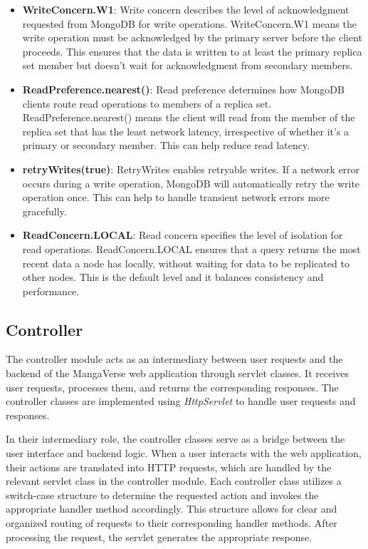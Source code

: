 \begin{itemize}
    \item \textbf{WriteConcern.W1}: Write concern describes the level of acknowledgment requested from MongoDB for write operations. 
    WriteConcern.W1 means the write operation must be acknowledged by the primary server before the client proceeds. 
    This ensures that the data is written to at least the primary replica set member but doesn't wait for 
    acknowledgment from secondary members.
    \item \textbf{ReadPreference.nearest()}: Read preference determines how MongoDB clients route read operations 
    to members of a replica set. ReadPreference.nearest() means the client will read from the member of the replica 
    set that has the least network latency, irrespective of whether it's a primary or secondary member. This can help 
    reduce read latency.
    \item \textbf{retryWrites(true)}: RetryWrites enables retryable writes. If a network error occurs during a write 
    operation, MongoDB will automatically retry the write operation once. This can help to handle transient network 
    errors more gracefully.
    \item \textbf{ReadConcern.LOCAL}: Read concern specifies the level of isolation for read operations. 
    ReadConcern.LOCAL ensures that a query returns the most recent data a node has locally, without waiting 
    for data to be replicated to other nodes. This is the default level and it balances consistency and performance.
\end{itemize}

\subsection*{Controller}

The controller module acts as an intermediary between user requests and the backend of the MangaVerse web application 
through servlet classes. It receives user requests, processes them, and returns the corresponding responses. 
The controller classes are implemented using \textit{HttpServlet} to handle user requests and responses.

\vspace{\baselineskip}

In their intermediary role, the controller classes serve as a bridge between the user interface and backend logic. 
When a user interacts with the web application, their actions are translated into HTTP requests, which are handled 
by the relevant servlet class in the controller module. Each controller class utilizes a switch-case structure to 
determine the requested action and invokes the appropriate handler method accordingly. This structure allows for 
clear and organized routing of requests to their corresponding handler methods. After processing the request, the 
servlet generates the appropriate response.

